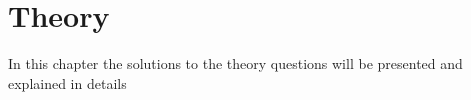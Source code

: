 \chapter{Theory}
\label{ch:theory}

In this chapter the solutions to the theory questions will be presented and explained in details

